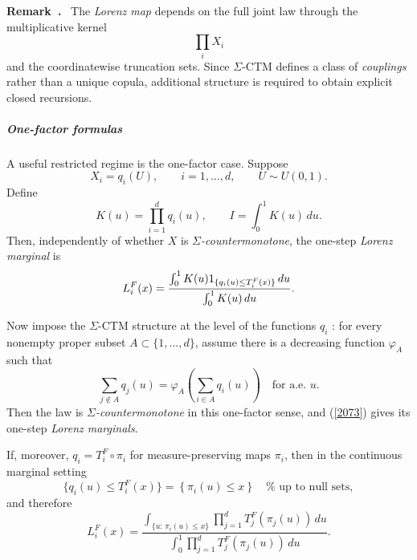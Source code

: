 \documentclass[onecolumn]{article}
\newenvironment{remark}{  \refstepcounter{theorem}  \par\medskip\noindent\textbf{Remark~\thetheorem.}\rmfamily\ }{\par\medskip}
\begin{document}
\begin{remark}
\medskip \noindent The \textit{Lorenz map} depends on the full joint law
through the multiplicative kernel 
\begin{equation*}
\prod_{i}X_{i}
\end{equation*}%
and the coordinatewise truncation sets. Since $\Sigma $-CTM defines a class
of \textit{couplings} rather than a unique copula, additional structure is
required to obtain explicit closed recursions. \medskip
\end{remark}

\subparagraph{One-factor formulas}

A useful restricted regime is the one-factor case. Suppose 
\begin{equation*}
X_{i}=q_{i}(U),\qquad i=1,\ldots ,d,\qquad U\sim U(0,1).
\end{equation*}%
Define 
\begin{equation*}
K(u)=\prod_{i=1}^{d}q_{i}(u),\qquad I=\int_{0}^{1}K(u)\,du.
\end{equation*}%
Then, independently of whether $X$ is $\Sigma $\textit{-countermonotone},
the one-step \textit{Lorenz marginal} is 
\begin{equation}
L_{i}^{F}(x)=\frac{\int_{0}^{1}K(u)1_{\{q_{i}(u)\leq T_{i}^{F}(x)\}}\,du}{%
\int_{0}^{1}K(u)\,du}.  \label{2073}
\end{equation}

Now impose the $\Sigma $-CTM structure at the level of the functions $q_{i}$%
: for every nonempty proper subset $A\subset \{1,\ldots ,d\}$, assume there
is a decreasing function $\varphi _{A}$ such that 
\begin{equation}
\sum_{j\notin A}q_{j}(u)=\varphi _{A}\left( \sum_{i\in A}q_{i}(u)\right)
\quad \text{for a.e. }u.  \label{2074}
\end{equation}%
Then the law is $\Sigma $\textit{-countermonotone} in this one-factor sense,
and (\ref{2073}) gives its one-step \textit{Lorenz marginals}.

If, moreover, $q_{i}=T_{i}^{F}\circ \pi _{i}$ for measure-preserving maps $%
\pi _{i}$, then in the continuous marginal setting 
\begin{equation*}
\{q_{i}(u)\leq T_{i}^{F}(x)\}=\left\{ \pi _{i}(u)\leq x\right\} \quad \text{%
up to null sets},
\end{equation*}%
and therefore 
\begin{equation}
L_{i}^{F}(x)=\frac{\int_{\{u:\,\pi _{i}(u)\leq
x\}}\prod_{j=1}^{d}T_{j}^{F}(\pi _{j}(u))\,du}{\int_{0}^{1}%
\prod_{j=1}^{d}T_{j}^{F}(\pi _{j}(u))\,du}.  \label{2076}
\end{equation}
\end{document}
